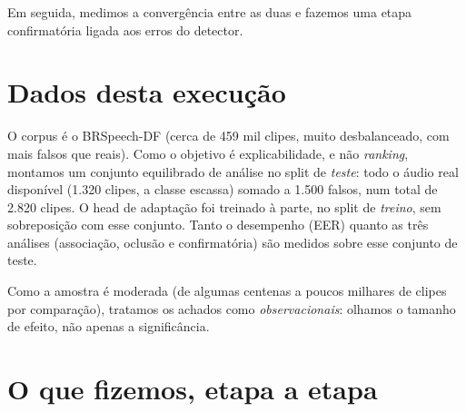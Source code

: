 \documentclass[11pt,a4paper]{article}
\begin{document}
Em seguida, medimos a convergência entre as duas e fazemos uma etapa
confirmatória ligada aos erros do detector.

\section{Dados desta execução}

O corpus é o BRSpeech-DF (cerca de 459 mil clipes, muito desbalanceado, com mais
falsos que reais). Como o objetivo é explicabilidade, e não \emph{ranking},
montamos um conjunto equilibrado de análise no split de \emph{teste}: todo o áudio
real disponível (1.320 clipes, a classe escassa) somado a 1.500 falsos, num total
de 2.820 clipes. O head de adaptação foi treinado à parte, no split de \emph{treino},
sem sobreposição com esse conjunto. Tanto o desempenho (EER) quanto as três análises
(associação, oclusão e confirmatória) são medidos sobre esse conjunto de teste.

Como a amostra é moderada (de algumas centenas a poucos milhares de clipes por
comparação), tratamos os achados como \emph{observacionais}: olhamos o tamanho de
efeito, não apenas a significância.

\section{O que fizemos, etapa a etapa}
\end{document}
